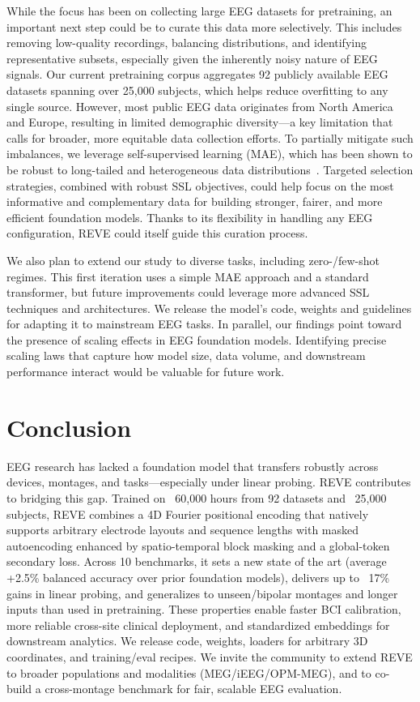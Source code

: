 \documentclass{article}
\begin{document}
While the focus has been on collecting large EEG datasets for pretraining, an important next step could be to curate this data more selectively. This includes removing low-quality recordings, balancing distributions, and identifying representative subsets, especially given the inherently noisy nature of EEG signals. Our current pretraining corpus aggregates 92 publicly available EEG datasets spanning over 25,000 subjects, which helps reduce overfitting to any single source. However, most public EEG data originates from North America and Europe, resulting in limited demographic diversity—a key limitation that calls for broader, more equitable data collection efforts. To partially mitigate such imbalances, we leverage self-supervised learning (MAE), which has been shown to be robust to long-tailed and heterogeneous data distributions~\citep{xu2023learning}. Targeted selection strategies, combined with robust SSL objectives, could help focus on the most informative and complementary data for building stronger, fairer, and more efficient foundation models. Thanks to its flexibility in handling any EEG configuration, REVE could itself guide this curation process.

We also plan to extend our study to diverse tasks, including zero-/few-shot regimes. This first iteration uses a simple MAE approach and a standard transformer, but future improvements could leverage more advanced SSL techniques and  architectures. We release the model’s code, weights and guidelines for adapting it to mainstream EEG tasks. In parallel, our findings point toward the presence of scaling effects in EEG foundation models. Identifying precise scaling laws that capture how model size, data volume, and downstream performance interact would be valuable for future work.
 

\section{Conclusion}

EEG research has lacked a foundation model that transfers robustly across devices, montages, and tasks—especially under linear probing. REVE contributes to bridging this gap. Trained on ~60,000 hours from 92 datasets and ~25,000 subjects, REVE combines a 4D Fourier positional encoding that natively supports arbitrary electrode layouts and sequence lengths with masked autoencoding enhanced by spatio-temporal block masking and a global-token secondary loss.
Across 10 benchmarks, it sets a new state of the art (average +2.5\% balanced accuracy over prior foundation models), delivers up to ~17\% gains in linear probing, and generalizes to unseen/bipolar montages and longer inputs than used in pretraining. These properties enable faster BCI calibration, more reliable cross-site clinical deployment, and standardized embeddings for downstream analytics. We release code, weights, loaders for arbitrary 3D coordinates, and training/eval recipes. We invite the community to extend REVE to broader populations and modalities (MEG/iEEG/OPM-MEG), and to co-build a cross-montage benchmark for fair, scalable EEG evaluation.
\end{document}
